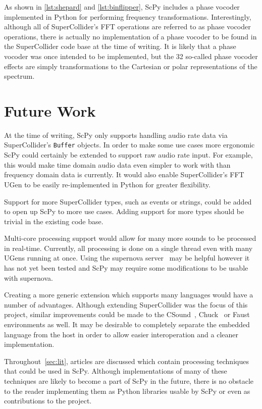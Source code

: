 \documentclass{article}
\begin{document}
As shown in \autoref{lst:shepard} and \autoref{lst:binflipper}, ScPy includes a phase vocoder
implemented in Python for performing frequency transformations. Interestingly, although all of
SuperCollider's FFT operations are referred to as phase vocoder operations, there is actually no
implementation of a phase vocoder to be found in the SuperCollider code base at the time of
writing. It is likely that a phase vocoder was once intended to be implemented, but the 32
so-called phase vocoder effects are simply transformations to the Cartesian or polar
representations of the spectrum.

\section{Future Work}

At the time of writing, ScPy only supports handling audio rate data via SuperCollider's
\texttt{Buffer} objects. In order to make some use cases more ergonomic ScPy could certainly be
extended to support raw audio rate input. For example, this would make time domain audio data even
simpler to work with than frequency domain data is currently. It would also enable SuperCollider's
FFT UGen to be easily re-implemented in Python for greater flexibility.

Support for more SuperCollider types, such as events or strings, could be added to open up ScPy to
more use cases. Adding support for more types should be trivial in the existing code base.

Multi-core processing support would allow for many more sounds to be processed in real-time.
Currently, all processing is done on a single thread even with many UGens running at once. Using
the supernova server~\cite{blechmann2005supernova} may be helpful however it has not yet been
tested and ScPy may require some modifications to be usable with supernova.

Creating a more generic extension which supports many languages would have a number of advantages.
Although extending SuperCollider was the focus of this project, similar improvements could be made
to the CSound~\cite{boulanger2000csound,lazzarini2005extensions}, Chuck~\cite{wang2008chuck} or
Faust~\cite{orlarey2009faust} environments as well. It may be desirable to completely separate the
embedded language from the host in order to allow easier interoperation and a cleaner
implementation.

Throughout~\autoref{sec:lit}, articles are discussed which contain processing techniques that could
be used in ScPy. Although implementations of many of these techniques are likely to become a part
of ScPy in the future, there is no obstacle to the reader implementing them as Python libraries
usable by ScPy or even as contributions to the project.
\end{document}
